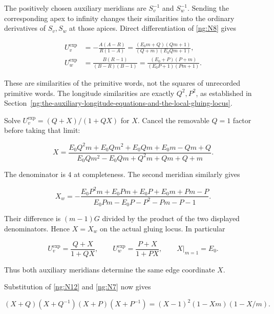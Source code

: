 The positively chosen auxiliary meridians are \(S_v^{-1}\) and
\(S_w^{-1}\). Sending the corresponding apex to infinity changes
their similarities into the ordinary derivatives of \(S_v,S_w\)
at those apices. Direct differentiation of \eqref{ng:N8} gives

\begin{equation}\label{ng:N11}
\begin{aligned}
 U_v^{\exp}
 &=-\frac{A(A-R)}{R(1-A)}
   =\frac{(E_0m+Q)(Qm+1)}{(Q+m)(E_0Qm+1)},\\
 U_w^{\exp}
 &=\frac{B(R-1)}{(B-R)(B-1)}
   =\frac{(E_0+P)(P+m)}{(E_0P+1)(Pm+1)}.
\end{aligned}
\end{equation}

These are similarities of the primitive words, not the squares of
unrecorded primitive words. The longitude similarities are
exactly \(Q^2,P^2\), as established in Section~\ref{ng:the-auxiliary-longitude-equations-and-the-local-gluing-locus}.

Solve \(U_v^{\exp}=(Q+X)/(1+QX)\) for \(X\).
Cancel the removable \(Q=1\) factor before taking that limit:

\begin{equation}\label{ng:N12}
X=
 \frac{E_0Q^2m+E_0Qm^2+E_0Qm+E_0m-Qm+Q}
 {E_0Qm^2-E_0Qm+Q^2m+Qm+Q+m}.
\end{equation}

The denominator is \(4\) at completeness. The second meridian
similarly gives

\begin{equation}\label{ng:N13}
X_w=-\frac{E_0P^2m+E_0Pm+E_0P+E_0m+Pm-P}
 {E_0Pm-E_0P-P^2-Pm-P-1}.
\end{equation}

Their difference is \((m-1)G\) divided by the product of the
two displayed denominators. Hence \(X=X_w\) on the actual
gluing locus. In particular

\begin{equation}\label{ng:N14}
U_v^{\exp}=\frac{Q+X}{1+QX},\qquad
 U_w^{\exp}=\frac{P+X}{1+PX},\qquad X|_{m=1}=E_0.
\end{equation}

Thus both auxiliary meridians determine the same edge coordinate $X$.

Substitution of \eqref{ng:N12} and \eqref{ng:N7} now gives

\begin{equation}\label{ng:N15}
(X+Q)(X+Q^{-1})(X+P)(X+P^{-1})
       =(X-1)^2(1-Xm)(1-X/m).
\end{equation}

